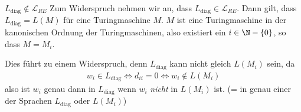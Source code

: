 \inlinetheorem $L_{\text{diag}} \notin \mathcal{L}_{RE}$
\inlineproof Zum Widerspruch nehmen wir an, dass $L_\text{diag} \in \mathcal{L}_{RE}$.
Dann gilt, dass $L_\text{diag} = L(M)$ für eine Turingmaschine $M$.
$M$ ist eine Turingmaschine in der kanonischen Ordnung der Turingmaschinen, also existiert ein $i \in \N - \{ 0 \}$, so dass $M = M_i$.

Dies führt zu einem Widerspruch, denn $L_\text{diag}$ kann nicht gleich $L(M_i)$ sein, da
\begin{align*}
    w_i \in L_\text{diag} \Longleftrightarrow d_{ii} = 0 \Longleftrightarrow w_i \notin L(M_i)
\end{align*}
also ist $w_i$ genau dann in $L_\text{diag}$ wenn $w_i$ \textit{nicht} in $L(M_i)$ ist. (= in genau einer der Sprachen $L_\text{diag}$ oder $L(M_i)$)
